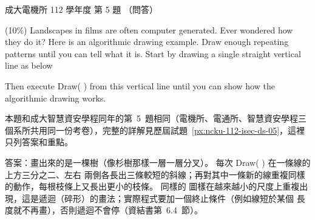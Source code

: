 \begin{pastexam}[label={px:ncku-112-ee-ds-05}]{成大電機所 112 學年度 第 5 題}
（問答）

(10\%) Landscapes in films are often computer generated. Ever wondered how they do it? Here is an
algorithmic drawing example. Draw enough repeating patterns until you can tell what it is. Start by
drawing a single straight vertical line as below

\begin{center}
\end{center}

Then execute Draw( ) from this vertical line until you can show how the algorithmic drawing works.

\begin{center}
\end{center}
\end{pastexam}

\begin{pastsoln}
本題和成大智慧資安學程同年的第~5~題相同（電機所、電通所、智慧資安學程三個系所共用同一份考卷），完整的詳解見歷屆試題~\ref{px:ncku-112-isec-ds-05}，這裡只列答案和重點。

答案：畫出來的是一棵樹（像杉樹那樣一層一層分叉）。 每次 Draw( ) 在一條線的上方三分之二、左右
兩側各長出三條較短的斜線；再對其中一條新的線重複同樣的動作，每根枝條上又長出更小的枝條。 同樣的
圖樣在越來越小的尺度上重複出現，這是遞迴（碎形）的畫法；實際程式要加一個終止條件（例如線短於某個
長度就不再畫），否則遞迴不會停（資結書第~6.4~節）。
\end{pastsoln}
